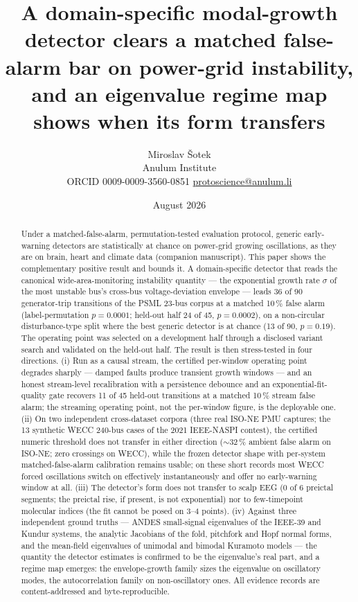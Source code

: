 \documentclass[11pt]{article}
\title{A domain-specific modal-growth detector clears a matched
false-alarm bar on power-grid instability, and an eigenvalue regime map
shows when its form transfers}
\author{Miroslav \v{S}otek\\
  Anulum Institute\\
  ORCID 0009-0009-3560-0851 \quad \href{mailto:protoscience@anulum.li}{protoscience@anulum.li}}
\date{August 2026}
\begin{document}
\maketitle

\begin{abstract}
Under a matched-false-alarm, permutation-tested evaluation protocol,
generic early-warning detectors are statistically at chance on
power-grid growing oscillations, as they are on brain, heart and
climate data (companion manuscript). This paper shows the complementary
positive result and bounds it. A domain-specific detector that reads
the canonical wide-area-monitoring instability quantity --- the
exponential growth rate $\sigma$ of the most unstable bus's cross-bus
voltage-deviation envelope --- leads 36 of 90 generator-trip
transitions of the PSML 23-bus corpus at a matched 10\,\% false alarm
(label-permutation $p = 0.0001$; held-out half 24 of 45, $p = 0.0002$),
on a non-circular disturbance-type split where the best generic
detector is at chance (13 of 90, $p = 0.19$). The operating point was
selected on a development half through a disclosed variant search and
validated on the held-out half. The result is then stress-tested in
four directions. (i) Run as a causal stream, the certified per-window
operating point degrades sharply --- damped faults produce transient
growth windows --- and an honest stream-level recalibration with a
persistence debounce and an exponential-fit-quality gate recovers 11 of
45 held-out transitions at a matched 10\,\% stream false alarm; the
streaming operating point, not the per-window figure, is the deployable
one. (ii) On two independent cross-dataset corpora (three real ISO-NE
PMU captures; the 13 synthetic WECC 240-bus cases of the 2021
IEEE-NASPI contest), the certified numeric threshold does not transfer
in either direction ($\sim$32\,\% ambient false alarm on ISO-NE; zero
crossings on WECC), while the frozen detector shape with per-system
matched-false-alarm calibration remains usable; on these short records
most WECC forced oscillations switch on effectively instantaneously and
offer no early-warning window at all. (iii) The detector's form does
not transfer to scalp EEG (0 of 6 preictal segments; the preictal rise,
if present, is not exponential) nor to few-timepoint molecular indices
(the fit cannot be posed on 3--4 points). (iv) Against three
independent ground truths --- ANDES small-signal eigenvalues of the
IEEE-39 and Kundur systems, the analytic Jacobians of the fold,
pitchfork and Hopf normal forms, and the mean-field eigenvalues of
unimodal and bimodal Kuramoto models --- the quantity the detector
estimates is confirmed to be the eigenvalue's real part, and a regime
map emerges: the envelope-growth family sizes the eigenvalue on
oscillatory modes, the autocorrelation family on non-oscillatory ones.
All evidence records are content-addressed and byte-reproducible.
\end{abstract}
\end{document}
